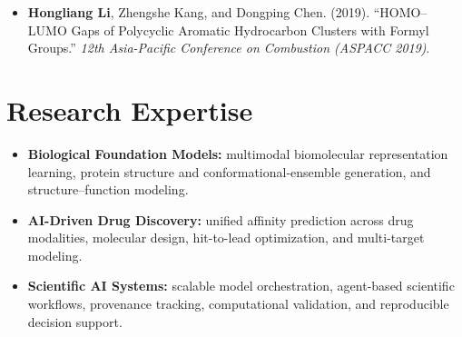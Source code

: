 \documentclass[10pt,a4paper]{article}
\newcommand{\publication}[1]{%
  \begin{itemize}[leftmargin=1.18em,label=\textbullet,itemsep=0.32em,topsep=0.14em,parsep=0pt,partopsep=0pt]
    \item #1
  \end{itemize}
}
\begin{document}
\publication{\textbf{Hongliang Li}, Zhengshe Kang, and Dongping Chen. (2019). ``HOMO--LUMO Gaps of Polycyclic Aromatic Hydrocarbon Clusters with Formyl Groups.'' \textit{12th Asia-Pacific Conference on Combustion (ASPACC 2019)}.}

\section{Research Expertise}
\begin{itemize}[leftmargin=1.18em,label=\textbullet,itemsep=0.24em,topsep=0.12em,parsep=0pt,partopsep=0pt]
  \item \textbf{Biological Foundation Models:} multimodal biomolecular representation learning, protein structure and conformational-ensemble generation, and structure--function modeling.
  \item \textbf{AI-Driven Drug Discovery:} unified affinity prediction across drug modalities, molecular design, hit-to-lead optimization, and multi-target modeling.
  \item \textbf{Scientific AI Systems:} scalable model orchestration, agent-based scientific workflows, provenance tracking, computational validation, and reproducible decision support.
\end{itemize}
\end{document}
